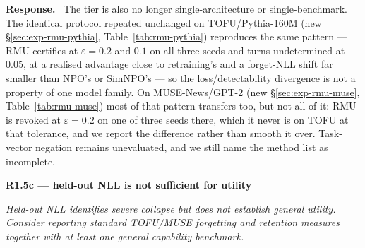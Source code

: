 \documentclass[11pt,a4paper]{article}
\newcommand{\eps}{\varepsilon}
\newenvironment{point}[1]{%
  \par\medskip\noindent\textbf{\color{rcol}#1}\par\nopagebreak\smallskip\begingroup
  \color{rcol}\itshape}{\endgroup\par}
\newenvironment{reply}{%
  \par\smallskip\noindent\textbf{\color{acol}Response.}\ \begingroup}{\endgroup\par}
\begin{document}
\begin{reply}
The tier is also no longer single-architecture or single-benchmark. The identical
protocol repeated unchanged on TOFU/Pythia-160M (new \S\ref{sec:exp-rmu-pythia}, Table~\ref{tab:rmu-pythia})
reproduces the same pattern --- RMU certifies at $\eps=0.2$ and $0.1$ on all three
seeds and turns undetermined at $0.05$, at a realised advantage close to retraining's
and a forget-NLL shift far smaller than NPO's or SimNPO's --- so the loss/detectability
divergence is not a property of one model family. On MUSE-News/GPT-2 (new
\S\ref{sec:exp-rmu-muse}, Table~\ref{tab:rmu-muse}) most of that pattern transfers too, but not all of
it: RMU is revoked at $\eps=0.2$ on one of three seeds there, which it never is on
TOFU at that tolerance, and we report the difference rather than smooth it over.
Task-vector negation remains unevaluated, and we still name the method list as
incomplete.
\end{reply}

\begin{point}{R1.5c --- held-out NLL is not sufficient for utility}
Held-out NLL identifies severe collapse but does not establish general utility.
Consider reporting standard TOFU/MUSE forgetting and retention measures together with
at least one general capability benchmark.
\end{point}
\end{document}

